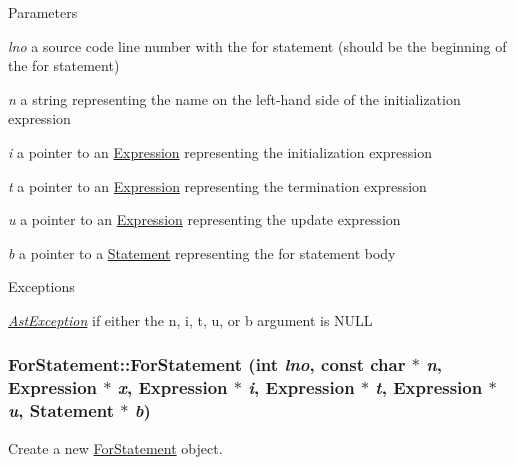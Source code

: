 \begin{DoxyParams}{Parameters}
\item[{\em lno}]a source code line number with the for statement (should be the beginning of the for statement) \item[{\em n}]a string representing the name on the left-\/hand side of the initialization expression \item[{\em i}]a pointer to an \hyperlink{classExpression}{Expression} representing the initialization expression \item[{\em t}]a pointer to an \hyperlink{classExpression}{Expression} representing the termination expression \item[{\em u}]a pointer to an \hyperlink{classExpression}{Expression} representing the update expression \item[{\em b}]a pointer to a \hyperlink{classStatement}{Statement} representing the for statement body \end{DoxyParams}

\begin{DoxyExceptions}{Exceptions}
\item[{\em \hyperlink{classAstException}{AstException}}]if either the n, i, t, u, or b argument is NULL \end{DoxyExceptions}
\hypertarget{classForStatement_a203c223b6af97279d479734239c76604}{
\subsubsection[{ForStatement}]{\setlength{\rightskip}{0pt plus 5cm}ForStatement::ForStatement (int {\em lno}, \/  const char $\ast$ {\em n}, \/  {\bf Expression} $\ast$ {\em x}, \/  {\bf Expression} $\ast$ {\em i}, \/  {\bf Expression} $\ast$ {\em t}, \/  {\bf Expression} $\ast$ {\em u}, \/  {\bf Statement} $\ast$ {\em b})}}
\label{classForStatement_a203c223b6af97279d479734239c76604}
Create a new \hyperlink{classForStatement}{ForStatement} object.


